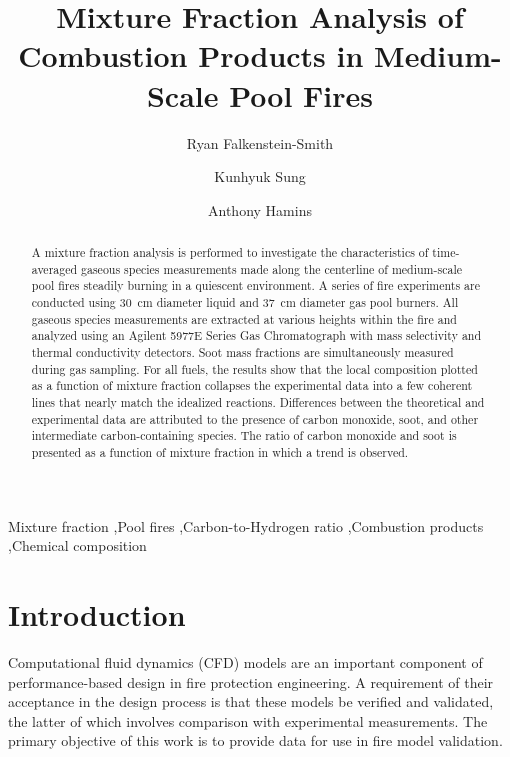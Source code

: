\documentclass[preprint,review,12pt]{elsarticle}
\begin{document}
\begin{frontmatter}

\title{Mixture Fraction Analysis of Combustion Products in Medium-Scale Pool Fires}

\author{Ryan Falkenstein-Smith}

\author{Kunhyuk Sung}
\author{Anthony Hamins}

\address{National Institute of Standards and Technology, 100 Bureau Dr., Gaithersburg, MD 20899, United States of America}

\begin{abstract}
A mixture fraction analysis is performed to investigate the characteristics of time-averaged gaseous species measurements made along the centerline of medium-scale pool fires steadily burning in a quiescent environment. A series of fire experiments are conducted using 30~cm diameter liquid and 37~cm diameter gas pool burners. All gaseous species measurements are extracted at various heights within the fire and analyzed using an Agilent 5977E Series Gas Chromatograph with mass selectivity and thermal conductivity detectors. Soot mass fractions are simultaneously measured during gas sampling. For all fuels, the results show that the local composition plotted as a function of mixture fraction collapses the experimental data into a few coherent lines that nearly match the idealized reactions. Differences between the theoretical and experimental data are attributed to the presence of carbon monoxide, soot, and other intermediate carbon-containing species. The ratio of carbon monoxide and soot is presented as a function of mixture fraction in which a trend is observed.
\end{abstract}

\begin{keyword}

Mixture fraction \sep Pool fires \sep Carbon-to-Hydrogen ratio \sep Combustion products \sep Chemical composition

\end{keyword}

\end{frontmatter}


\ifdefined \wordcount
\clearpage
\fi

\section{Introduction}
\label{Introduction}
Computational fluid dynamics (CFD) models are an important component of performance-based design in fire protection engineering. A requirement of their acceptance in the design process is that these models be verified and validated, the latter of which involves comparison with experimental measurements. The primary objective of this work is to provide data for use in fire model validation.
\end{document}
